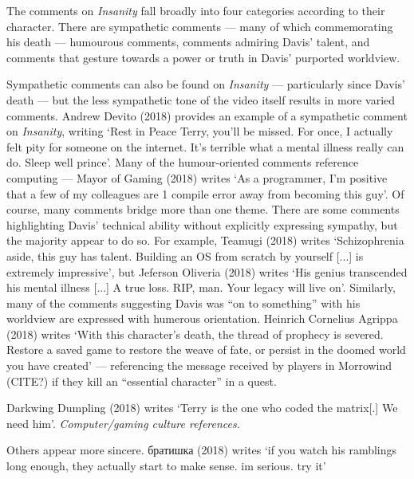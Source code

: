 \documentclass[Draft.tex]{subfiles}
\begin{document}
The comments on \textit{Insanity} fall broadly into four categories according
to their character.
There are sympathetic comments --- many of which commemorating his death ---
humourous comments, comments admiring Davis' talent, and comments that
gesture towards a power or truth in Davis' purported worldview.

Sympathetic comments can also be found on \textit{Insanity} --- particularly
since Davis' death --- but the less sympathetic tone of the video itself
results in more varied comments.
Andrew Devito (2018) provides an example of a sympathetic comment
on \textit{Insanity}, writing `Rest in Peace Terry, you'll be missed.
For once, I actually felt pity for someone on the internet.
It's terrible what a mental illness really can do. Sleep well prince'.
Many of the humour-oriented comments reference computing ---
Mayor of Gaming (2018) writes `As a programmer, I'm positive that
a few of my colleagues are 1 compile error away from becoming this guy'.
Of course, many comments bridge more than one theme.
There are some comments highlighting Davis' technical ability without
explicitly expressing sympathy, but the majority appear to do so.
For example, Teamugi (2018) writes
`Schizophrenia aside, this guy has talent.
Building an OS from scratch by yourself [...] is extremely impressive',
but Jeferson Oliveria (2018) writes
`His genius transcended his mental illness [...] A true loss.
RIP, man.  Your legacy will live on'.
Similarly, many of the comments suggesting Davis was ``on to something''
with his worldview are expressed with humerous orientation.
Heinrich Cornelius Agrippa (2018) writes `With this character's death,
the thread of prophecy is severed.
Restore a saved game to restore the weave of fate,
or persist in the doomed world you have created' --- referencing the
message received by players in Morrowind (CITE?) if they kill an
``essential character'' in a quest.

Darkwing Dumpling (2018) writes
`Terry is the one who coded the matrix[.] We need him'.
\textit{Computer/gaming culture references.}

Others appear more sincere.
\foreignlanguage{russian}{братишка} (2018) writes `if you watch his ramblings long enough,
they actually start to make sense. im serious. try it'
\end{document}
